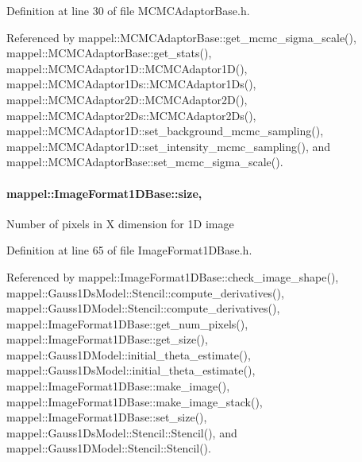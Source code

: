 Definition at line 30 of file M\+C\+M\+C\+Adaptor\+Base.\+h.



Referenced by mappel\+::\+M\+C\+M\+C\+Adaptor\+Base\+::get\+\_\+mcmc\+\_\+sigma\+\_\+scale(), mappel\+::\+M\+C\+M\+C\+Adaptor\+Base\+::get\+\_\+stats(), mappel\+::\+M\+C\+M\+C\+Adaptor1\+D\+::\+M\+C\+M\+C\+Adaptor1\+D(), mappel\+::\+M\+C\+M\+C\+Adaptor1\+Ds\+::\+M\+C\+M\+C\+Adaptor1\+Ds(), mappel\+::\+M\+C\+M\+C\+Adaptor2\+D\+::\+M\+C\+M\+C\+Adaptor2\+D(), mappel\+::\+M\+C\+M\+C\+Adaptor2\+Ds\+::\+M\+C\+M\+C\+Adaptor2\+Ds(), mappel\+::\+M\+C\+M\+C\+Adaptor1\+D\+::set\+\_\+background\+\_\+mcmc\+\_\+sampling(), mappel\+::\+M\+C\+M\+C\+Adaptor1\+D\+::set\+\_\+intensity\+\_\+mcmc\+\_\+sampling(), and mappel\+::\+M\+C\+M\+C\+Adaptor\+Base\+::set\+\_\+mcmc\+\_\+sigma\+\_\+scale().

\paragraph[{\texorpdfstring{size}{size}}]{ mappel\+::\+Image\+Format1\+D\+Base\+::size\hspace{0.3cm}{\ttfamily [protected]}, {\ttfamily [inherited]}}\hypertarget{classmappel_1_1ImageFormat1DBase_a8941b4d028e4dd881146a7c1b9039bb1}{}\label{classmappel_1_1ImageFormat1DBase_a8941b4d028e4dd881146a7c1b9039bb1}
Number of pixels in X dimension for 1D image 

Definition at line 65 of file Image\+Format1\+D\+Base.\+h.



Referenced by mappel\+::\+Image\+Format1\+D\+Base\+::check\+\_\+image\+\_\+shape(), mappel\+::\+Gauss1\+Ds\+Model\+::\+Stencil\+::compute\+\_\+derivatives(), mappel\+::\+Gauss1\+D\+Model\+::\+Stencil\+::compute\+\_\+derivatives(), mappel\+::\+Image\+Format1\+D\+Base\+::get\+\_\+num\+\_\+pixels(), mappel\+::\+Image\+Format1\+D\+Base\+::get\+\_\+size(), mappel\+::\+Gauss1\+D\+Model\+::initial\+\_\+theta\+\_\+estimate(), mappel\+::\+Gauss1\+Ds\+Model\+::initial\+\_\+theta\+\_\+estimate(), mappel\+::\+Image\+Format1\+D\+Base\+::make\+\_\+image(), mappel\+::\+Image\+Format1\+D\+Base\+::make\+\_\+image\+\_\+stack(), mappel\+::\+Image\+Format1\+D\+Base\+::set\+\_\+size(), mappel\+::\+Gauss1\+Ds\+Model\+::\+Stencil\+::\+Stencil(), and mappel\+::\+Gauss1\+D\+Model\+::\+Stencil\+::\+Stencil().

